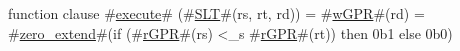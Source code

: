 function clause #\hyperref[zexecute]{execute}# (#\hyperref[zSLT]{SLT}#(rs, rt, rd)) =
  {
    #\hyperref[zwGPR]{wGPR}#(rd) = #\hyperref[zzzerozyextend]{zero\_extend}#(if (#\hyperref[zrGPR]{rGPR}#(rs) <_s #\hyperref[zrGPR]{rGPR}#(rt)) then 0b1 else 0b0)
  }
